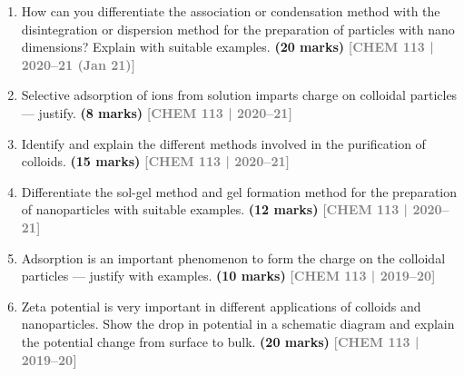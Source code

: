 \documentclass[12pt,a3paper]{article}
\newcommand{\yr}[1]{\hfill\textcolor{gray}{\small\textbf{[#1]}}}
\newcommand{\mk}[1]{\textcolor{orange!70!black}{\small\textbf{(#1 marks)}}}
\begin{document}
\begin{enumerate}



\item How can you differentiate the association or condensation method with the disintegration or dispersion method for the preparation of particles with nano dimensions? Explain with suitable examples. \mk{20}
\yr{CHEM 113 | 2020--21 (Jan 21)}




\item Selective adsorption of ions from solution imparts charge on colloidal particles --- justify. \mk{8}
\yr{CHEM 113 | 2020--21}




\item Identify and explain the different methods involved in the purification of colloids. \mk{15}
\yr{CHEM 113 | 2020--21}




\item Differentiate the sol-gel method and gel formation method for the preparation of nanoparticles with suitable examples. \mk{12}
\yr{CHEM 113 | 2020--21}




\item Adsorption is an important phenomenon to form the charge on the colloidal particles --- justify with examples. \mk{10}
\yr{CHEM 113 | 2019--20}




\item Zeta potential is very important in different applications of colloids and nanoparticles. Show the drop in potential in a schematic diagram and explain the potential change from surface to bulk. \mk{20}
\yr{CHEM 113 | 2019--20}






\end{enumerate}
\end{document}
